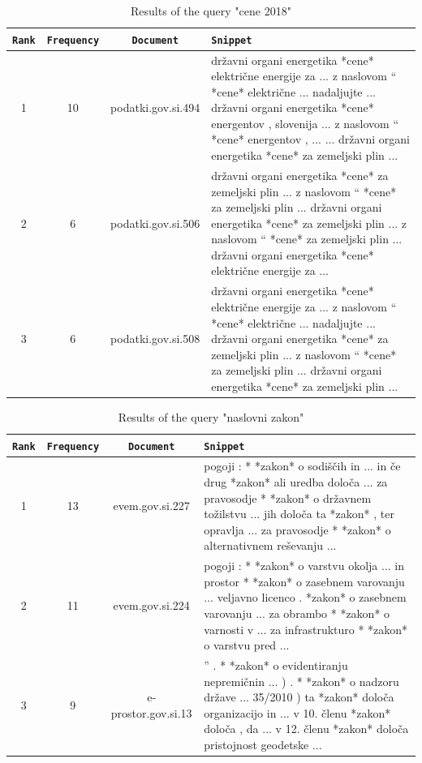 \documentclass{article}
\begin{document}
	\begin{table}[!hbt]
		\centering
		\begin{tabularx}{\textwidth}{c|c|c|X}
			\texttt{Rank} & \texttt{Frequency} & \texttt{Document} & \texttt{Snippet}  \\ \hline
			1& 10 & podatki.gov.si.494&  državni organi energetika *cene* električne energije za ... z naslovom `` *cene* električne ... nadaljujte ... državni organi energetika *cene* energentov , slovenija ... z naslovom `` *cene* energentov , ... ... državni organi energetika *cene* za zemeljski plin ... \\ \hline
			2& 6 & podatki.gov.si.506 & državni organi energetika *cene* za zemeljski plin ... z naslovom `` *cene* za zemeljski plin ... državni organi energetika *cene* za zemeljski plin ... z naslovom `` *cene* za zemeljski plin ... državni organi energetika *cene* električne energije za ... \\ \hline
			3 & 6 & podatki.gov.si.508 & državni organi energetika *cene* električne energije za ... z naslovom `` *cene* električne ... nadaljujte ... državni organi energetika *cene* za zemeljski plin ... z naslovom `` *cene* za zemeljski plin ... državni organi energetika *cene* za zemeljski plin ...
		\end{tabularx}
		\caption{Results of the query "cene 2018"}
		\label{tab:5}
	\end{table}{}
	\begin{table}[!hbt]
		\centering
		\begin{tabularx}{\textwidth}{c|c|c|X}
			\texttt{Rank} & \texttt{Frequency} & \texttt{Document} & \texttt{Snippet}  \\ \hline
			1& 13 & evem.gov.si.227& pogoji : * *zakon* o sodiščih in ... in če drug *zakon* ali uredba določa ... za pravosodje * *zakon* o državnem tožilstvu ... jih določa ta *zakon* , ter opravlja ... za pravosodje * *zakon* o alternativnem reševanju ...  \\ \hline
			2& 11 & evem.gov.si.224 & pogoji : * *zakon* o varstvu okolja ... in prostor * *zakon* o zasebnem varovanju ... veljavno licenco . *zakon* o zasebnem varovanju ... za obrambo * *zakon* o varnosti v ... za infrastrukturo * *zakon* o varstvu pred ... \\ \hline
			3 & 9 & e-prostor.gov.si.13 &'' . * *zakon* o evidentiranju nepremičnin ... ) . * *zakon* o nadzoru države ... 35/2010 ) ta *zakon* določa organizacijo in ... v 10. členu *zakon* določa , da ... v 12. členu *zakon* določa pristojnost geodetske ...                                                        
		\end{tabularx}
		\caption{Results of the query "naslovni zakon"}
		\label{tab:6}
	\end{table}{}
	
\end{document}
